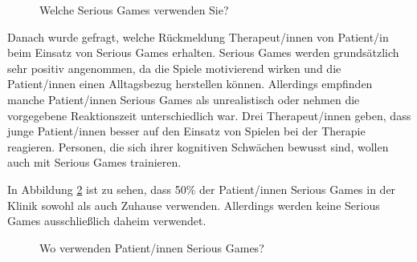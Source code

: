 \begin{figure}[H]
    \centering
    \caption{Welche Serious Games verwenden Sie?}
    \label{fig:therapists-used-serious-games}
\end{figure}

Danach wurde gefragt, welche Rückmeldung Therapeut/innen von Patient/in beim Einsatz von Serious Games erhalten. Serious Games werden grundsätzlich sehr positiv angenommen, da die Spiele motivierend wirken und die Patient/innen einen Alltagsbezug herstellen können. Allerdings empfinden manche Patient/innen Serious Games als unrealistisch oder nehmen die vorgegebene Reaktionszeit unterschiedlich war. Drei Therapeut/innen geben, dass junge Patient/innen besser auf den Einsatz von Spielen bei der Therapie reagieren. Personen, die sich ihrer kognitiven Schwächen bewusst sind, wollen auch mit Serious Games trainieren.

In Abbildung \ref{fig:therapeutic-where-are-serious-games-used} ist zu sehen, dass 50\% der Patient/innen Serious Games in der Klinik sowohl als auch Zuhause verwenden. Allerdings werden keine Serious Games ausschließlich daheim verwendet.

\begin{figure}[H]
    \centering
    \caption{Wo verwenden Patient/innen Serious Games?}
    \label{fig:therapeutic-where-are-serious-games-used}
\end{figure}

